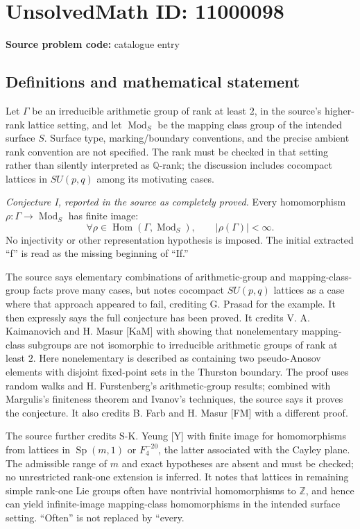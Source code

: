 \documentclass[11pt]{article}
\newcommand{\Z}{\mathbb{Z}}
\newcommand{\Q}{\mathbb{Q}}
\begin{document}
\section*{UnsolvedMath ID: 11000098}
\textbf{Source problem code:} catalogue entry
\subsection{Definitions and mathematical statement}
Let \(\Gamma\) be an irreducible arithmetic group of rank at least \(2\), in the source's higher-rank lattice setting, and let \(\operatorname{Mod}_S\) be the mapping class group of the intended surface \(S\). Surface type, marking/boundary conventions, and the precise ambient rank convention are not specified. The rank must be checked in that setting rather than silently interpreted as \(\Q\)-rank; the discussion includes cocompact lattices in \(SU(p,q)\) among its motivating cases.

\emph{Conjecture I, reported in the source as completely proved.} Every homomorphism \(\rho:\Gamma\to\operatorname{Mod}_S\) has finite image:
\[
 \forall\rho\in\operatorname{Hom}(\Gamma,\operatorname{Mod}_S),
 \qquad |\rho(\Gamma)|<\infty.
\]
No injectivity or other representation hypothesis is imposed. The initial extracted ``f'' is read as the missing beginning of ``If.''

The source says elementary combinations of arithmetic-group and mapping-class-group facts prove many cases, but notes cocompact \(SU(p,q)\) lattices as a case where that approach appeared to fail, crediting G. Prasad for the example. It then expressly says the full conjecture has been proved. It credits V. A. Kaimanovich and H. Masur [KaM] with showing that nonelementary mapping-class subgroups are not isomorphic to irreducible arithmetic groups of rank at least \(2\). Here nonelementary is described as containing two pseudo-Anosov elements with disjoint fixed-point sets in the Thurston boundary. The proof uses random walks and H. Furstenberg's arithmetic-group results; combined with Margulis's finiteness theorem and Ivanov's techniques, the source says it proves the conjecture. It also credits B. Farb and H. Masur [FM] with a different proof.

The source further credits S-K. Yeung [Y] with finite image for homomorphisms from lattices in \(\operatorname{Sp}(m,1)\) or \(F_4^{-20}\), the latter associated with the Cayley plane. The admissible range of \(m\) and exact hypotheses are absent and must be checked; no unrestricted rank-one extension is inferred. It notes that lattices in remaining simple rank-one Lie groups often have nontrivial homomorphisms to \(\Z\), and hence can yield infinite-image mapping-class homomorphisms in the intended surface setting. ``Often'' is not replaced by ``every.
\end{document}
